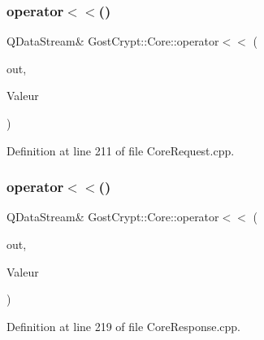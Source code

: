 \mbox{\label{namespace_gost_crypt_1_1_core_aaf4d294548c3f9bb2946ddf7fad98a0c}} 
\subsubsection{\texorpdfstring{operator$<$$<$()}{operator<<()}\hspace{0.1cm}{\footnotesize\ttfamily [40/56]}}
{\footnotesize\ttfamily Q\+Data\+Stream\& Gost\+Crypt\+::\+Core\+::operator$<$$<$ (\begin{DoxyParamCaption}\item[{Q\+Data\+Stream \&}]{out,  }\item[{const \hyperlink{struct_gost_crypt_1_1_core_1_1_get_mounted_volumes_request}{Get\+Mounted\+Volumes\+Request} \&}]{Valeur }\end{DoxyParamCaption})}



Definition at line 211 of file Core\+Request.\+cpp.

\mbox{\label{namespace_gost_crypt_1_1_core_af2eff56a99d6d4fd0ee989c8b5d544f5}} 
\subsubsection{\texorpdfstring{operator$<$$<$()}{operator<<()}\hspace{0.1cm}{\footnotesize\ttfamily [41/56]}}
{\footnotesize\ttfamily Q\+Data\+Stream\& Gost\+Crypt\+::\+Core\+::operator$<$$<$ (\begin{DoxyParamCaption}\item[{Q\+Data\+Stream \&}]{out,  }\item[{const \hyperlink{struct_gost_crypt_1_1_core_1_1_benchmark_algorithms_response}{Benchmark\+Algorithms\+Response} \&}]{Valeur }\end{DoxyParamCaption})}



Definition at line 219 of file Core\+Response.\+cpp.

\mbox{\label{namespace_gost_crypt_1_1_core_afaa600a239b99669879ddcd5d7818887}} 
